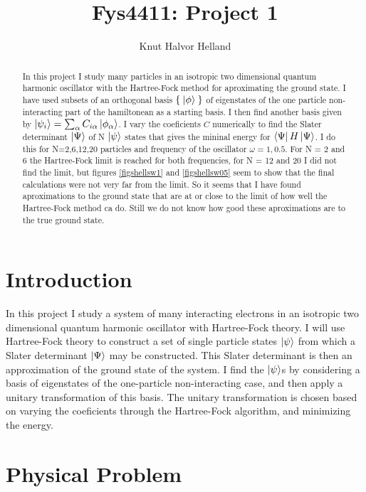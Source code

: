 \documentclass[a4paper,english,12pt]{article}
\title{Fys4411: Project 1}
\author{Knut Halvor Helland}
\begin{document}
\maketitle{}

\begin{abstract}
  In this project I study many particles in an isotropic two dimensional quantum harmonic oscillator with the Hartree-Fock method for aproximating
  the ground state.
  I have used subsets of an orthogonal basis \(\Set{\Ket{\phi}}\) of eigenstates of the one particle non-interacting part of the hamiltonean
  as a starting basis. I then find another basis given by \(\ket{\psi_i} = \sum_\alpha C_{i\alpha}\ket{\phi_\alpha}\). I vary the coeficients $C$
  numerically
  to find the Slater determinant $\Ket{\Psi}$ of N $\ket{\psi}$ states that gives the mininal energy for $\Bra{\Psi}H\Ket{\Psi}$. I do this
  for N=2,6,12,20 particles and frequency of the oscillator $\omega = 1,0.5$. For N = 2 and 6 the Hartree-Fock limit is reached for both frequencies,
  for N = 12 and 20 I did not find the limit, but figures \ref{figshellsw1} and \ref{figshellsw05} seem to show that the final calculations were not
  very far from the limit. So it seems that I have found aproximations to the ground state that are at or close to the limit of how well
  the Hartree-Fock method ca do. Still we do not know how good these aproximations are to the true ground state.
  

\end{abstract}

\section{Introduction}

In this project I study a system of many interacting electrons in an isotropic two dimensional quantum harmonic oscillator with Hartree-Fock theory.
I will use Hartree-Fock theory to construct a set of single particle states $\ket{\psi}$ from which a Slater determinant $\Ket{\Psi}$
may be constructed. This Slater determinant is then an approximation of the ground state of the system. I find the $\ket{\psi}$s by considering
a basis of eigenstates of the one-particle non-interacting case, and then apply a unitary transformation of this basis. The unitary transformation
is chosen based on varying the coeficients through the Hartree-Fock algorithm, and minimizing the energy.

\section{Physical Problem}
\end{document}
